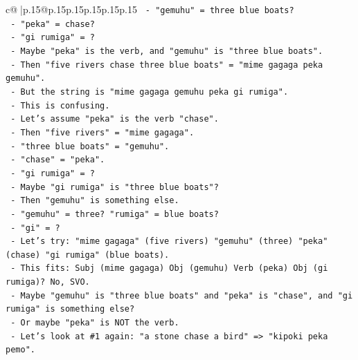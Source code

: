\documentclass{article}
\begin{document}
{\begin{supertabular}{c@{$\;$}|p{.15\linewidth}@{}p{.15\linewidth}p{.15\linewidth}p{.15\linewidth}p{.15\linewidth}p{.15\linewidth}}
{{{\texttt{                            {-} "gemuhu" = three blue boats?} \\
\texttt{                            {-} "peka" = chase?} \\
\texttt{                            {-} "gi rumiga" = ?} \\
\texttt{                            {-} Maybe "peka" is the verb, and "gemuhu" is "three blue boats".} \\
\texttt{                            {-} Then "five rivers chase three blue boats" = "mime gagaga peka gemuhu".} \\
\texttt{                            {-} But the string is "mime gagaga gemuhu peka gi rumiga".} \\
\texttt{                            {-} This is confusing.} \\
\texttt{                            {-} Let's assume "peka" is the verb "chase".} \\
\texttt{                            {-} Then "five rivers" = "mime gagaga".} \\
\texttt{                            {-} "three blue boats" = "gemuhu".} \\
\texttt{                            {-} "chase" = "peka".} \\
\texttt{                            {-} "gi rumiga" = ?} \\
\texttt{                            {-} Maybe "gi rumiga" is "three blue boats"?} \\
\texttt{                            {-} Then "gemuhu" is something else.} \\
\texttt{                            {-} "gemuhu" = three? "rumiga" = blue boats?} \\
\texttt{                            {-} "gi" = ?} \\
\texttt{                            {-} Let's try: "mime gagaga" (five rivers) "gemuhu" (three) "peka" (chase) "gi rumiga" (blue boats).} \\
\texttt{                            {-} This fits: Subj (mime gagaga) Obj (gemuhu) Verb (peka) Obj (gi rumiga)? No, SVO.} \\
\texttt{                            {-} Maybe "gemuhu" is "three blue boats" and "peka" is "chase", and "gi rumiga" is something else?} \\
\texttt{                            {-} Or maybe "peka" is NOT the verb.} \\
\texttt{                            {-} Let's look at \#1 again: "a stone chase a bird" => "kipoki peka pemo".} \\
}}}
\end{supertabular}}
\end{document}

